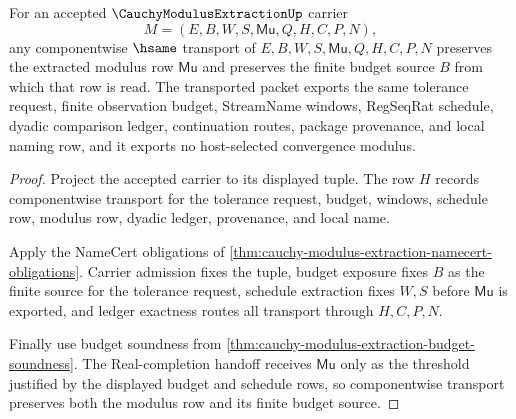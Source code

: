 \begin{theorem}
\label{thm:cauchy-modulus-extraction-transport-stability}
For an accepted $\CauchyModulusExtractionUp$ carrier
$$
M=(E,B,W,S,\mathsf{Mu},Q,H,C,P,N),
$$
any componentwise $\hsame$ transport of $E,B,W,S,\mathsf{Mu},Q,H,C,P,N$ preserves the extracted modulus row $\mathsf{Mu}$ and preserves the finite budget source $B$ from which that row is read. The transported packet exports the same tolerance request, finite observation budget, StreamName windows, RegSeqRat schedule, dyadic comparison ledger, continuation routes, package provenance, and local naming row, and it exports no host-selected convergence modulus.
\end{theorem}
\begin{proof}
Project the accepted carrier to its displayed tuple. The row $H$ records componentwise transport for the tolerance request, budget, windows, schedule row, modulus row, dyadic ledger, provenance, and local name.

Apply the NameCert obligations of \autoref{thm:cauchy-modulus-extraction-namecert-obligations}. Carrier admission fixes the tuple, budget exposure fixes $B$ as the finite source for the tolerance request, schedule extraction fixes $W,S$ before $\mathsf{Mu}$ is exported, and ledger exactness routes all transport through $H,C,P,N$.

Finally use budget soundness from \autoref{thm:cauchy-modulus-extraction-budget-soundness}. The Real-completion handoff receives $\mathsf{Mu}$ only as the threshold justified by the displayed budget and schedule rows, so componentwise transport preserves both the modulus row and its finite budget source.
\end{proof}

